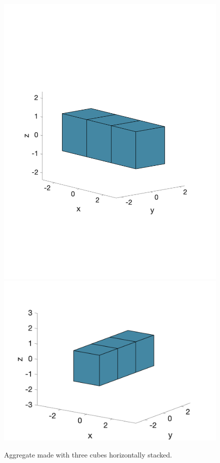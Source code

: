     \begin{figure}[h]
    	\begin{center}
    		\vspace{0.5cm}
			\includegraphics[scale=0.35]{./figures/fig_NC3_hor}		
			\hspace{20mm}
			\includegraphics[scale=0.38]{./figures/fig_NC3_hor92}		
    	\caption{Aggregate made with three cubes horizontally stacked.}
    	\label{fig_NC3_hor_92}
    \end{center}
\end{figure}
